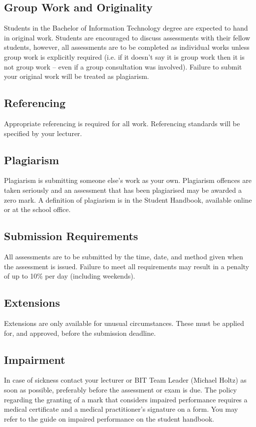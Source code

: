 \documentclass{article}
\begin{document}
\subsection*{Group Work and Originality}
Students in the Bachelor of Information Technology degree are expected to hand in original work. Students are encouraged to discuss assessments with their fellow students, however, all assessments are to be completed as individual works unless group work is explicitly required (i.e. if it doesn’t say it is group work then it is not group work – even if a group consultation was involved). Failure to submit your original work will be treated as plagiarism.

\subsection*{Referencing}
Appropriate referencing is required for all work. Referencing standards will be specified by your lecturer.

\subsection*{Plagiarism}
Plagiarism is submitting someone else’s work as your own. Plagiarism offences are taken seriously and an assessment that has been plagiarised may be awarded a zero mark. A definition of plagiarism is in the Student Handbook, available online or at the school office.

\subsection*{Submission Requirements}
All assessments are to be submitted by the time, date, and method given when the assessment is issued. Failure to meet all requirements may result in a penalty of up to 10\% per day (including weekends).

\subsection*{Extensions}
Extensions are only available for unusual circumstances. These must be applied for, and approved, before the submission deadline.

\subsection*{Impairment}
In case of sickness contact your lecturer or BIT Team Leader (Michael Holtz) as soon as possible, preferably before the assessment or exam is due. The policy regarding the granting of a mark that considers impaired performance requires a medical certificate and a medical practitioner’s signature on a form. You may refer to the guide on impaired performance on the student handbook.
\end{document}
